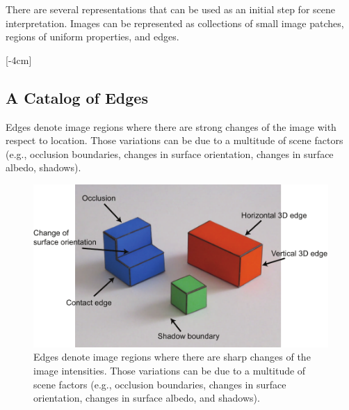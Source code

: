 




% 
%
There are several representations that can be used as an initial step for scene interpretation. Images can be represented as collections of small image patches, regions of uniform properties, and edges. 


[-4cm]

\subsection{A Catalog of Edges}

Edges denote image regions where there are strong changes of the image  with respect to location. Those variations can be due to a multitude of scene factors (e.g., occlusion boundaries, changes in surface orientation, changes in surface albedo, shadows).

\begin{figure}[t]
\centerline{
\includegraphics[width=.9\linewidth]{figures/simplesystem/edgeLabeling.pdf}
} 
\caption{Edges denote image regions where there are sharp changes of the image intensities. Those variations can be due to a multitude of scene factors (e.g., occlusion boundaries, changes in surface orientation, changes in surface albedo, and shadows).} 
\label{fig:edgeLabeling}
\end{figure}

